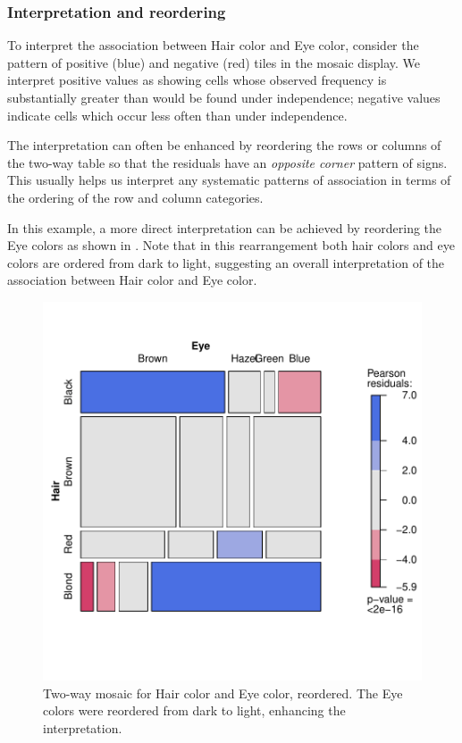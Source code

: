 \documentclass[11pt]{book}
\renewenvironment{knitrout}{\small\renewcommand{\baselinestretch}{.85}}{} %
\begin{document}
\subsubsection{Interpretation and reordering}

To interpret the association between Hair color and Eye color,
consider the pattern of positive (blue) and negative (red)
tiles in the mosaic display.  
We interpret positive values as showing cells whose observed frequency
is substantially greater than would be found under independence;
negative values indicate cells which occur less often than
under independence.

The interpretation can often be enhanced by reordering the rows or columns
of the two-way table so that the residuals have an \emph{opposite
corner} pattern of signs.  This usually helps us interpret any systematic
patterns of association in terms of the ordering of the row and column
categories.

In this example, a more direct interpretation can be achieved by
reordering the Eye colors as shown in
. 
Note that in this rearrangement
both hair colors and eye colors are ordered from dark to light,
suggesting an overall interpretation of the association
between Hair color and Eye color.

\begin{knitrout}
\color{fgcolor}\begin{kframe}
\begin{alltt}
 \hlkwb{<-} \hlstd{haireye[,} \hlstd{(}\hlstd{,} \hlstd{,} \hlstd{,} \hlstd{)]}
 \hlstd{=}\hlstd{)}
\end{alltt}
\end{kframe}\begin{figure}[!htbp]


\centerline{\includegraphics[width=.6\textwidth]{ch05/fig/haireye-mos9} }

\caption[Two-way mosaic for Hair color and Eye color, reordered]{Two-way mosaic for Hair color and Eye color, reordered. The Eye colors were reordered from dark to light, enhancing the interpretation.\label{fig:haireye-mos9}}
\end{figure}


\end{knitrout}
\end{document}
